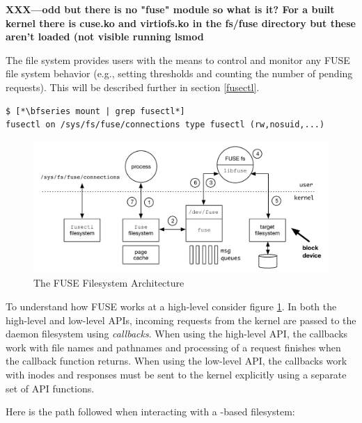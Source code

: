\textbf{XXX---odd but there is no "fuse" module so what is it? For a built kernel there is cuse.ko and virtiofs.ko in the fs/fuse directory but these aren't loaded (not visible running lsmod}

The  file system provides users with the means to control and monitor any FUSE file system behavior (e.g., setting thresholds and counting the number of pending requests). This will be described further in section \ref{fusectl}.

\begin{lstlisting}
$ [*\bfseries mount | grep fusectl*]
fusectl on /sys/fs/fuse/connections type fusectl (rw,nosuid,...)
\end{lstlisting}

\begin{figure}
	\includegraphics[scale=0.6]{figures/fuse.pdf}
	\centering
	\caption{The FUSE Filesystem Architecture}
	\label{fig:fuse}
\end{figure}

\noindent
To understand how FUSE works at a high-level consider figure \ref{fig:fuse}. In both the high-level and low-level APIs, incoming requests from the kernel are passed to the  daemon filesystem using \textit{callbacks}. When using the high-level API, the callbacks work with file names and pathnames and processing of a request finishes when the callback function returns. When using the low-level API, the callbacks work with inodes and responses must be sent to the kernel explicitly using a separate set of API functions.

Here is the path followed when interacting with a -based filesystem:

